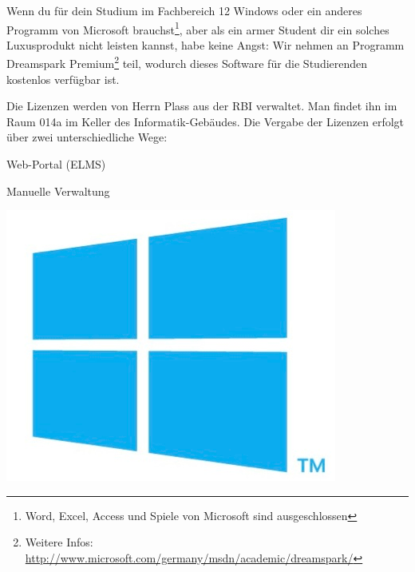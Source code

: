 Wenn du für dein Studium im Fachbereich 12 Windows oder ein anderes Programm von Microsoft brauchst\footnote{Word, Excel, Access und Spiele von Microsoft sind ausgeschlossen}, aber als ein armer Student dir ein solches Luxusprodukt nicht leisten kannst, habe keine Angst: Wir nehmen an Programm Dreamspark Premium\footnote{Weitere Infos: \url{http://www.microsoft.com/germany/msdn/academic/dreamspark/}} teil, wodurch dieses Software für die Studierenden kostenlos verfügbar ist. %

Die Lizenzen werden von Herrn Plass aus der RBI verwaltet. Man findet ihn im Raum 014a im Keller des Informatik-Gebäudes.
Die Vergabe der Lizenzen erfolgt über zwei unterschiedliche Wege:

\begin{noindItemize}
	\item Web-Portal (ELMS)
	\item Manuelle Verwaltung
\end{noindItemize}


\begin{center}
	\includegraphics[scale=0.35]{bitmaps/win8logo}
\end{center}

